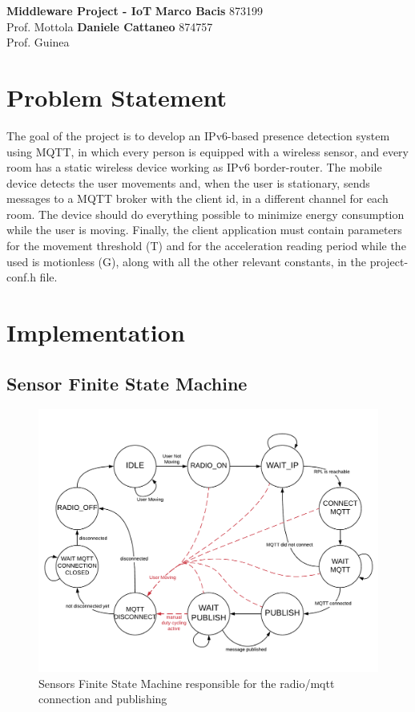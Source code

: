 \documentclass[a4paper, 10pt]{article}
\begin{document}
\noindent
\large\textbf{Middleware Project - IoT} \hfill \textbf{Marco Bacis} 873199 \\
Prof. Mottola \hfill \textbf{Daniele Cattaneo} 874757 \\
Prof. Guinea

\section*{Problem Statement}

The goal of the project is to develop an IPv6-based presence detection system using MQTT, in which every person is equipped with a wireless sensor, and every room has a static wireless device working as IPv6 border-router.
The mobile device detects the user movements and, when the user is stationary, sends messages to a MQTT broker with the client id, in a different channel for each room.
The device should do everything possible to minimize energy consumption while the user is moving.
Finally, the client application must contain parameters for the movement threshold (T) and for the acceleration reading period while the used is motionless (G), along with all the other relevant constants, in the project-conf.h file.

\section*{Implementation}

\subsection*{Sensor Finite State Machine}

\begin{figure}[h]
\centering
    \includegraphics[width=\linewidth]{images/fsm.pdf}
    \caption{Sensors Finite State Machine responsible for the radio/mqtt connection and publishing}
    \label{fig:sensor_fsm}
\end{figure}
\end{document}
